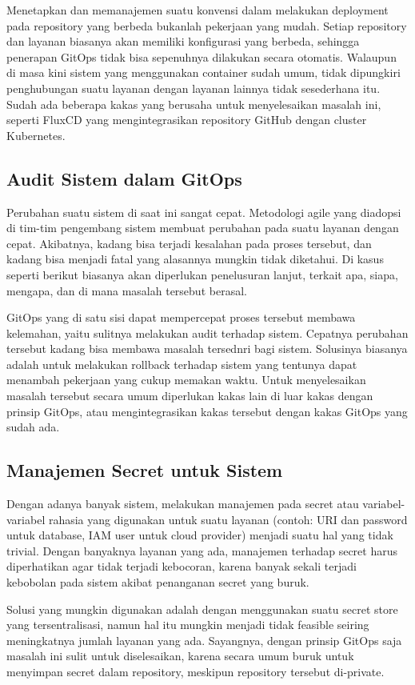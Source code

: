 Menetapkan dan memanajemen suatu konvensi dalam melakukan deployment pada repository yang berbeda bukanlah pekerjaan yang mudah. Setiap repository dan layanan biasanya akan memiliki konfigurasi yang berbeda, sehingga penerapan GitOps tidak bisa sepenuhnya dilakukan secara otomatis. Walaupun di masa kini sistem yang menggunakan container sudah umum, tidak dipungkiri penghubungan suatu layanan dengan layanan lainnya tidak sesederhana itu. Sudah ada beberapa kakas yang berusaha untuk menyelesaikan masalah ini, seperti FluxCD yang mengintegrasikan repository GitHub dengan cluster Kubernetes.

\subsection{Audit Sistem dalam GitOps}

Perubahan suatu sistem di saat ini sangat cepat. Metodologi agile yang diadopsi di tim-tim pengembang sistem membuat perubahan pada suatu layanan dengan cepat. Akibatnya, kadang bisa terjadi kesalahan pada proses tersebut, dan kadang bisa menjadi fatal yang alasannya mungkin tidak diketahui. Di kasus seperti berikut biasanya akan diperlukan penelusuran lanjut, terkait apa, siapa, mengapa, dan di mana masalah tersebut berasal.

GitOps yang di satu sisi dapat mempercepat proses tersebut membawa kelemahan, yaitu sulitnya melakukan audit terhadap sistem. Cepatnya perubahan tersebut kadang bisa membawa masalah tersednri bagi sistem. Solusinya biasanya adalah untuk melakukan rollback terhadap sistem yang tentunya dapat menambah pekerjaan yang cukup memakan waktu. Untuk menyelesaikan masalah tersebut secara umum diperlukan kakas lain di luar kakas dengan prinsip GitOps, atau mengintegrasikan kakas tersebut dengan kakas GitOps yang sudah ada.

\subsection{Manajemen Secret untuk Sistem}

Dengan adanya banyak sistem, melakukan manajemen pada secret atau variabel-variabel rahasia yang digunakan untuk suatu layanan (contoh: URI dan password untuk database, IAM user untuk cloud provider) menjadi suatu hal yang tidak trivial. Dengan banyaknya layanan yang ada, manajemen terhadap secret harus diperhatikan agar tidak terjadi kebocoran, karena banyak sekali terjadi kebobolan pada sistem akibat penanganan secret yang buruk.

Solusi yang mungkin digunakan adalah dengan menggunakan suatu secret store yang tersentralisasi, namun hal itu mungkin menjadi tidak feasible seiring meningkatnya jumlah layanan yang ada. Sayangnya, dengan prinsip GitOps saja masalah ini sulit untuk diselesaikan, karena secara umum buruk untuk menyimpan secret dalam repository, meskipun repository tersebut di-private.